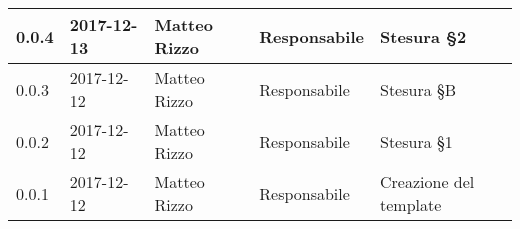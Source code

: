 \documentclass[./PianodiProgetto.tex]{subfiles}
\begin{document}
\begin{longtable}{|p{20mm}|p{20mm}|p{40mm}|p{30mm}|p{50mm}|}
		\hline 0.0.4 & 2017-12-13 & Matteo Rizzo & Responsabile & Stesura §2 \\
 
 		\hline 0.0.3 & 2017-12-12 & Matteo Rizzo & Responsabile & Stesura §B \\
 		
		\hline 0.0.2 & 2017-12-12 & Matteo Rizzo & Responsabile & Stesura §1 \\
 
 		\hline 0.0.1 & 2017-12-12 & Matteo Rizzo & Responsabile & Creazione del template \\
 
		\hline
 
	\end{longtable}
\end{document}
